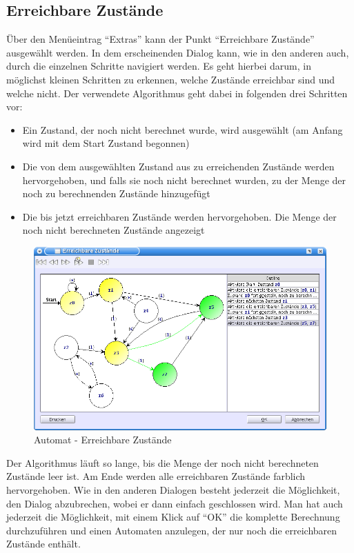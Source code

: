 \subsection{Erreichbare Zustände}\label{ReachableStates}

Über den Menüeintrag "`Extras"' kann der Punkt "`Erreichbare Zustände"'
ausgewählt werden. In dem erscheinenden Dialog kann, wie in den anderen auch,
durch die einzelnen Schritte navigiert werden. Es geht hierbei darum, in
möglichst kleinen Schritten zu erkennen, welche Zustände erreichbar sind und
welche nicht. Der verwendete Algorithmus geht dabei in folgenden drei Schritten
vor:

\begin{itemize}
  \item Ein Zustand, der noch nicht berechnet wurde, wird ausgewählt (am Anfang
  wird mit dem Start Zustand begonnen)
  \item Die von dem ausgewählten Zustand aus zu erreichenden Zustände werden
  hervorgehoben, und falls sie noch nicht berechnet wurden, zu der Menge der
  noch zu berechnenden Zustände hinzugefügt
  \item Die bis jetzt erreichbaren Zustände werden hervorgehoben. Die Menge der
  noch nicht berechneten Zustände angezeigt 
\end{itemize}

\begin{figure}[h!]
\begin{center}
\includegraphics[width=12cm]{../images/reachable_states.png}
\caption{Automat - Erreichbare Zustände}
\end{center}
\end{figure}

Der Algorithmus läuft so lange, bis die Menge der noch nicht berechneten Zustände
leer ist. Am Ende werden alle erreichbaren Zustände farblich hervorgehoben. Wie
in den anderen Dialogen besteht jederzeit die Möglichkeit, den Dialog
abzubrechen, wobei er dann einfach geschlossen wird. Man hat auch jederzeit die
Möglichkeit, mit einem Klick auf "`OK"' die komplette Berechnung durchzuführen
und einen Automaten anzulegen, der nur noch die erreichbaren Zustände enthält.

